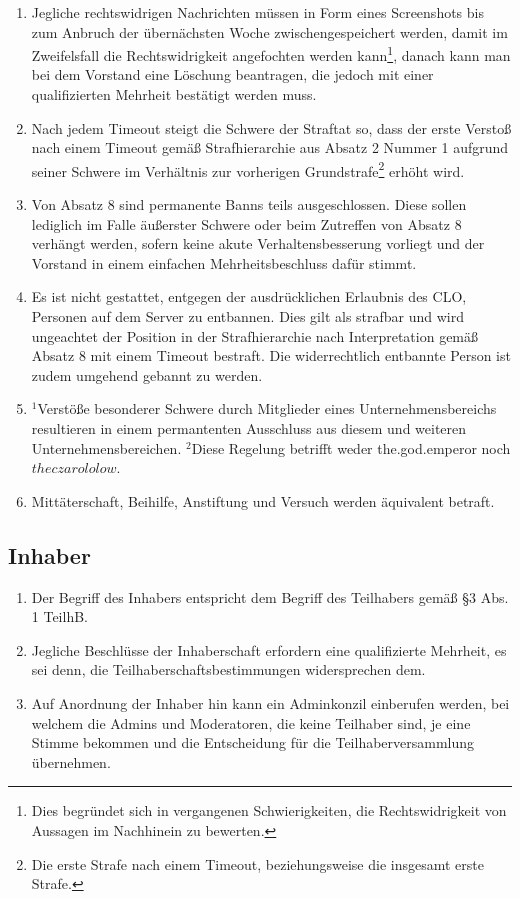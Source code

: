 \documentclass{article}
\begin{document}
\begin{enumerate}[(1)]
	\item Jegliche rechtswidrigen Nachrichten müssen in Form eines Screenshots bis zum Anbruch der übernächsten Woche zwischengespeichert werden, damit im Zweifelsfall die Rechtswidrigkeit angefochten werden kann\footnote{Dies begründet sich in vergangenen Schwierigkeiten, die Rechtswidrigkeit von Aussagen im Nachhinein zu bewerten.}, danach kann man bei dem Vorstand eine Löschung beantragen, die jedoch mit einer qualifizierten Mehrheit bestätigt werden muss.
	\item Nach jedem Timeout steigt die Schwere der Straftat so, dass der erste Verstoß nach einem Timeout gemäß Strafhierarchie aus Absatz 2 Nummer 1  aufgrund seiner Schwere im Verhältnis zur vorherigen Grundstrafe\footnote{Die erste Strafe nach einem Timeout, beziehungsweise die insgesamt erste Strafe.} erhöht wird.
	\item Von Absatz 8 sind permanente Banns teils ausgeschlossen. Diese sollen lediglich im Falle äußerster Schwere oder beim Zutreffen von Absatz 8 verhängt werden, sofern keine akute Verhaltensbesserung vorliegt und der Vorstand in einem einfachen Mehrheitsbeschluss dafür stimmt.
	\item Es ist nicht gestattet, entgegen der ausdrücklichen Erlaubnis des CLO, Personen auf dem Server zu entbannen. Dies gilt als strafbar und wird ungeachtet der Position in der Strafhierarchie nach Interpretation gemäß Absatz 8 mit einem Timeout bestraft. Die widerrechtlich entbannte Person ist zudem umgehend gebannt zu werden.
	\item $^{1}$Verstöße besonderer Schwere durch Mitglieder eines Unternehmensbereichs resultieren in einem permantenten Ausschluss aus diesem und weiteren Unternehmensbereichen. $^{2}$Diese Regelung betrifft weder the.god.emperor noch $theczarololow$.
	\item Mittäterschaft, Beihilfe, Anstiftung und Versuch werden äquivalent betraft.
\end{enumerate}

\subsection{Inhaber}
\begin{enumerate}[(1)]
	\item Der Begriff des Inhabers entspricht dem Begriff des Teilhabers gemäß §3 Abs. 1 TeilhB.
	\item Jegliche Beschlüsse der Inhaberschaft erfordern eine qualifizierte Mehrheit, es sei denn, die Teilhaberschaftsbestimmungen widersprechen dem.
	\item Auf Anordnung der Inhaber hin kann ein Adminkonzil einberufen werden, bei welchem die Admins und Moderatoren, die keine Teilhaber sind, je eine Stimme bekommen und die Entscheidung für die Teilhaberversammlung übernehmen.
\end{enumerate}
\end{document}
